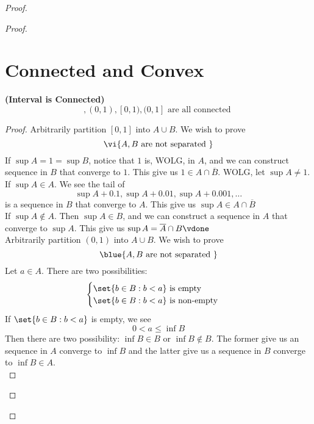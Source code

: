 \documentclass{report}
\begin{document}
\begin{proof}
\begin{proof}
\section{Connected and Convex}
\begin{theorem}
\label{3.4.1}
\textbf{(Interval is Connected)} 
\begin{equation*}
[0,1],(0,1),[0,1),(0,1]\text{ are all connected }
\end{equation*}
\end{theorem}
\begin{proof}
Arbitrarily partition $[0,1]$ into $A\cup B$. We wish to prove
\begin{equation*}
  \vi{A,B\text{ are not separated }}
\end{equation*}
If $\sup A=1=\sup B$, notice that $1$ is, WOLG, in $A$, and we can construct sequence in $B$ that converge to  $1$. This give us $1\in A\cap \overline{B}$. WOLG, let  $\sup A\neq 1$.\\


If $\sup A\in A$. We see the tail of
 \begin{equation*}
\sup A+0.1, \sup A+0.01, \sup A+0.001,\dots
\end{equation*}
is a sequence in $B$ that converge to  $A$. This give us $\sup A\in A\cap \overline{B}$\\

If $\sup A\not\in A$. Then $\sup A\in B$, and we can construct a sequence in $A$ that converge to  $\sup A$. This give us $\sup A=\overline{A}\cap B\vdone$\\

Arbitrarily partition $(0,1)$ into $A\cup B$. We wish to prove 
\begin{equation*}
\blue{A,B\text{ are not separated }}
\end{equation*}
Let $a\in A$. There are two possibilities:
\begin{equation*}
\begin{cases}
  \set{b\in B: b<a}\text{ is empty }\\
  \set{b\in B:b<a}\text{ is non-empty }
\end{cases}
\end{equation*}
If $\set{b\in B:b<a}$ is empty, we see
\begin{equation*}
0<a\leq \inf B
\end{equation*}
Then there are two possibility: $\inf B\in B\text{ or } \inf B\not\in B$. The former give us an sequence in $A$ converge to  $\inf B$ and the latter give us a sequence in $B$ converge to  $\inf B\in A$.\\


\end{proof}
\end{proof}
\end{proof}
\end{document}
